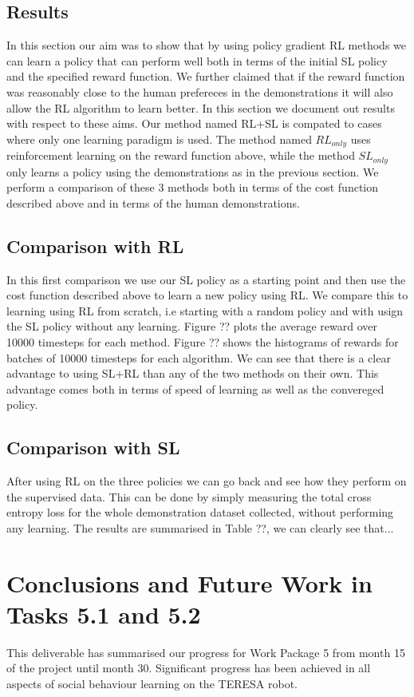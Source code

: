 \documentclass[a4paper,11pt]{report}
\begin{document}
\subsection{Results}
In this section our aim was to show that by using policy gradient RL methods we can learn a policy that can perform well both in terms of the initial SL policy and the specified reward function. We further claimed that if the reward function was reasonably close to the human prefereces in the demonstrations it will also allow the RL algorithm to learn better. In this section we document out results with respect to these aims. Our method named RL+SL is compated to cases where only one learning paradigm is used. The method named $RL_{only}$ uses reinforcement learning on the reward function above, while the method $SL_{only}$ only learns a policy using the demonstrations as in the previous section. We perform a comparison of these 3 methods both in terms of the cost function described above and in terms of the human demonstrations.

\subsection{Comparison with RL}
In this first comparison we use our SL policy as a starting point and then use the cost function described above to learn a new policy using RL. We compare this to learning using RL from scratch, i.e starting with a random policy and with usign the SL policy without any learning. Figure ?? plots the average reward over 10000 timesteps for each method. Figure ?? shows the histograms of rewards for batches of 10000 timesteps for each algorithm. We can see that there is a clear advantage to using SL+RL than any of the two methods on their own. This advantage comes both in terms of speed of learning as well as the convereged policy.

\subsection{Comparison with SL}
After using RL on the three policies we can go back and see how they perform on the supervised data. This can be done by simply measuring the total cross entropy loss for the whole demonstration dataset collected, without performing any learning. The results are summarised in Table ??, we can clearly see that...  

\section{Conclusions and Future Work in Tasks 5.1 and 5.2}
\label{sec:conclusions}
This deliverable has summarised our progress for Work Package 5 from month 15 of the project until month 30. Significant progress has been achieved in all aspects of social behaviour learning on the TERESA robot. 
\end{document}
